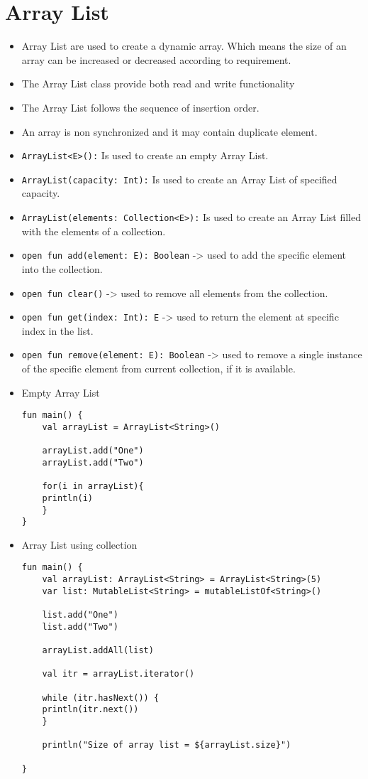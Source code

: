 \documentclass[11pt]{article}
\begin{document}
\section*{Array List}
\label{sec:org16a8a43}
\begin{itemize}
\item Array List are used to create a dynamic array. Which means the
size of an array can be increased or decreased according to
requirement.
\item The Array List class provide both read and write functionality
\item The Array List follows the sequence of insertion order.
\item An array is non synchronized and it may contain duplicate element.
\item \texttt{ArrayList<E>():} Is used to create an empty Array List.
\item \texttt{ArrayList(capacity: Int):} Is used to create an Array List of
specified capacity.
\item \texttt{ArrayList(elements: Collection<E>):} Is used to create an Array
List filled with the elements of a collection.
\item \texttt{open fun add(element: E): Boolean} -> used to add the specific
element into the collection.
\item \texttt{open fun clear()} -> used to remove all elements from the collection.
\item \texttt{open fun get(index: Int): E} -> used to return the element at
specific index in the list.
\item \texttt{open fun remove(element: E): Boolean} -> used to remove a single
instance of the specific element from current collection, if it is
available.
\item Empty Array List 
\begin{verbatim}
fun main() {
    val arrayList = ArrayList<String>()

    arrayList.add("One")
    arrayList.add("Two")

    for(i in arrayList){
	println(i)
    }
}
\end{verbatim}
\item Array List using collection
\begin{verbatim}
fun main() {
    val arrayList: ArrayList<String> = ArrayList<String>(5)
    var list: MutableList<String> = mutableListOf<String>()

    list.add("One")
    list.add("Two")

    arrayList.addAll(list)

    val itr = arrayList.iterator()

    while (itr.hasNext()) {
	println(itr.next())
    }

    println("Size of array list = ${arrayList.size}")

}
\end{verbatim}
\end{itemize}
\end{document}
